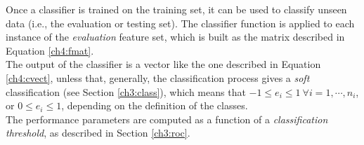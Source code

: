 Once a classifier is trained on the training set, it can be used to classify unseen data (i.e., the evaluation or testing set). The classifier
function is applied to each instance of the \textit{evaluation} feature set, which is built as the matrix described in Equation \ref{ch4:fmat}.\\
The output of the classifier is a vector like the one described in Equation \ref{ch4:cvect}, unless that, generally, the classification
process gives a \textit{soft} classification (see Section \ref{ch3:class}), which means that  $-1 \leq e_i \leq 1 \ \forall i = 1,\cdots,n_i$, or
$0 \leq e_i \leq 1$, depending on the definition of the classes.\\
The performance parameters are computed as a function of a \textit{classification threshold}, as described in Section \ref{ch3:roc}.




 


